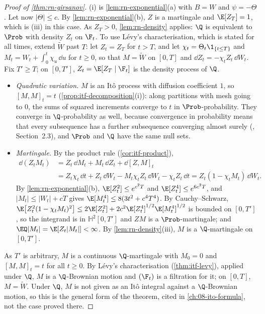 \begin{proof}[Proof of \cref{thm:rn-girsanov}]
(i) is \cref{lem:rn-exponential}(a) with $B=W$ and $\psi=-\Theta$. Let now $|\Theta|\le c$.
By \cref{lem:rn-exponential}(b), $Z$ is a martingale and $\E[Z_T]=1$, which is (iii) in
this case. As $Z_T>0$, \cref{lem:rn-density} applies: $\Q$ is equivalent to $\Prob$ with
density $Z_t$ on $\F_t$. To use L\'evy's characterisation, which is stated for all times,
extend $\widetilde W$ past $T$: let $Z_t=Z_T$ for $t>T$, and let
$\chi_t=\Theta_t\1_{\{t\le T\}}$ and $M_t=W_t+\int_0^t\chi_u\,\dd u$ for $t\ge0$, so that
$M=\widetilde W$ on $[0,T]$ and $\dd Z_t=-\chi_tZ_t\,\dd W_t$. Fix $T'\ge T$; on $[0,T']$, $Z_t=\E[Z_T\mid\F_t]$ is the density process of $\Q$.
\begin{itemize}
  \item \emph{Quadratic variation.} $M$ is an It\^o process with diffusion coefficient
    $1$, so $[M,M]_t=t$ (\cref{prop:itf-decomposition}(i)): along partitions with mesh going
    to $0$, the sums of squared increments converge to $t$ in $\Prob$-probability. They
    converge in $\Q$-probability as well, because convergence in probability means that
    every subsequence has a further subsequence converging almost surely
    (\textcite{durrett}, Section~2.3), and $\Prob$ and $\Q$ have the same null sets.
  \item \emph{Martingale.} By the product rule (\cref{cor:itf-product}),
    \begin{align*}
      \dd(Z_tM_t)&=Z_t\,\dd M_t+M_t\,\dd Z_t+\dd[Z,M]_t\\
      &=Z_t\chi_t\,\dd t+Z_t\,\dd W_t-M_t\chi_tZ_t\,\dd W_t-\chi_tZ_t\,\dd t
      =Z_t(1-\chi_tM_t)\,\dd W_t .
    \end{align*}
    By \cref{lem:rn-exponential}(b), $\E[Z_t^2]\le e^{c^2T}$ and
    $\E[Z_t^4]\le e^{6c^2T}$, and $|M_t|\le|W_t|+cT$ gives $\E[M_t^4]\le8(3t^2+c^4T^4)$. By
    Cauchy--Schwarz, $\E\big[Z_t^2(1-\chi_tM_t)^2\big]\le2\E[Z_t^2]+
    2c^2\E[Z_t^4]^{1/2}\E[M_t^4]^{1/2}$ is bounded on $[0,T']$, so the integrand is in
    $\mathbb H^2[0,T']$ and $ZM$ is a $\Prob$-martingale; and
    $\EQ|M_t|=\E[Z_t|M_t|]<\infty$. By \cref{lem:rn-density}(iii), $M$ is a
    $\Q$-martingale on $[0,T']$.
\end{itemize}
As $T'$ is arbitrary, $M$ is a continuous $\Q$-martingale with $M_0=0$ and $[M,M]_t=t$ for
all $t\ge0$. By L\'evy's characterisation (\cref{thm:itf-levy}), applied under $\Q$, $M$ is
a $\Q$-Brownian motion and $(\F_t)$ is a filtration for it; on $[0,T]$, $M=\widetilde W$. Under
$\Q$, $M$ is not given as an It\^o integral against a $\Q$-Brownian motion, so this is the
general form of the theorem, cited in \cref{ch:08-ito-formula}, not the case proved there.
\end{proof}

